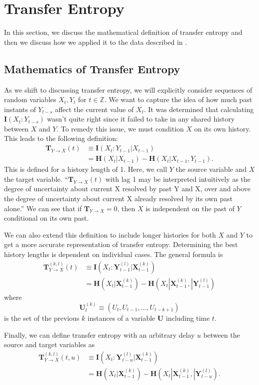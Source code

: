 \documentclass{article}
\theoremstyle{definition}
\newcommand{\Hb}{\mathbf{H}}
\newcommand{\Ib}{\mathbf{I}}
\newcommand{\Tb}{\mathbf{T}}
\newcommand{\Ub}{\mathbf{U}}
\newcommand{\Xb}{\mathbf{X}}
\newcommand{\Yb}{\mathbf{Y}}
\newcommand{\Z}{\mathbb{Z}}
\begin{document}
\section{Transfer Entropy}
In this section, we discuss the mathematical definition of transfer entropy and then we discuss how we applied it to the data described in .
\subsection{Mathematics of Transfer Entropy}
As we shift to discussing transfer entropy, we will explicitly consider sequences of random variables $X_t, Y_t$ for $t \in \Z$. We want to capture the idea of how much past instants of $Y_{t-s}$ affect the current value of $X_t$. It was determined that calculating $\Ib(X_t : Y_{t-s})$ wasn't quite right since it failed to take in any shared history between $X$ and $Y$. To remedy this issue, we must condition $X$ on its own history. This leads to the following definition:
\begin{align*}
\Tb_{Y\to X}(t) &\equiv \Ib(X_t : Y_{t-1} | X_{t-1}) \\
&= \Hb(X_t | X_{t-1}) - \Hb(X_t | X_{t-1}, Y_{t-1}).
\end{align*}
This is defined for a history length of 1. Here, we call $Y$ the source variable and $X$ the target variable. ``$\Tb_{Y \to X}(t)$ with lag 1 may be interpreted intuitively as the degree
of uncertainty about current X resolved by past Y and X, over and above the
degree of uncertainty about current X already resolved by its own past alone.'' \cite[p.~68]{bossomaier2016introduction} We can see that if $\Tb_{Y \to X} = 0$, then $X$ is independent on the past of $Y$ conditional on its own past. 

We can also extend this definition to include longer histories for both $X$ and $Y$ to get a more accurate representation of transfer entropy. Determining the best history lengths is dependent on individual cases. The general formula is 
\begin{align*}
\Tb_{Y \to X}^{(k,l)}(t)&\equiv \Ib(X_t : \Yb_{t-1}^{(l)}|\Xb_{t-1}^{(k)}) \\
&= \Hb(X_t |\Xb_{t-1}^{(k)} ) - \Hb(X_t | \Xb_{t-1}^{(k)}, |\Yb_{t-1}^{(l)})
\end{align*}
where
\[\Ub_t^{(k)} \equiv (U_t, U_{t-1},\ldots, U_{t-k+1})\] 
is the set of the previous $k$ instances of a variable $\Ub$ including time $t$. 

Finally, we can define transfer entropy with an arbitrary delay $u$ between the source and target variables as 
\begin{align*}
\Tb_{Y \to X}^{(k,l)}(t,u)&\equiv \Ib(X_t : \Yb_{t-u}^{(l)}|\Xb_{t-1}^{(k)}) \\
&= \Hb(X_t |\Xb_{t-1}^{(k)} ) - \Hb(X_t | \Xb_{t-1}^{(k)}, |\Yb_{t-u}^{(l)}).
\end{align*}
\end{document}
